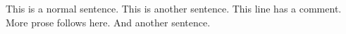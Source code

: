 This is a normal sentence. This is another sentence.
This line has a comment. %
More prose follows here. And another sentence.
